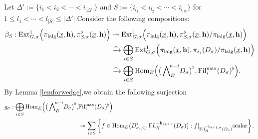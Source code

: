 \documentclass[10pt]{article}
\newcommand{\fil}{{\rm Fil}}
\newcommand{\homo}{{\rm Hom}}
\newcommand{\ext}{{\rm Ext}}
\newcommand{\lalg}{{\rm lalg}}
\newcommand{\bh}{{\mathbf{h}}}
\begin{document}
Let $\Delta':=\{i_1<i_2<\cdots<i_{|\Delta'|}\}$ and $S:=\{i_{l_1}<i_{l_2}<\cdots<i_{l_{|S|}}\}$ for $1\leq l_1<\cdots<l_{|S|}\leq |\Delta'|$.\;Consider the following compositions:
\begin{equation}\label{compositionfinalSver}
	\begin{aligned}
	\beta_S:	\ext^1_{G,\sigma}\Big(\pi_{\lalg}(\underline{x},\bh),\pi^{\flat}_{S,\sigma}(\underline{x},\bh)\Big)&\twoheadrightarrow \ext^1_{G,\sigma}\Big(\pi_{\lalg}(\underline{x},\bh),\pi^{\flat}_{S,\sigma}(\underline{x},\bh)/\pi_{\lalg}(\underline{x},\bh)\Big)\\
		&\xrightarrow{\sim}\bigoplus_{i\in S}\ext^1_{G,\sigma}\Big(\pi_{\lalg}(\underline{x},\bh),\pi_{s_i}(D_{\sigma})/\pi_{\lalg}(\underline{x},\bh)\Big)\\
		&\xrightarrow{\sim}\bigoplus_{i\in S}\homo_E\Big(\big(\bigwedge\nolimits_{E}^{\!n-i}\!D_{\sigma}\big)^{\flat},\fil_i^{\max}(D_{\sigma})^{\flat}\Big).\;
	\end{aligned}
\end{equation}
By Lemma \ref{lemforwedge},\;we obtain the following  surjection
\begin{equation}
	\begin{aligned}
		g_{\sigma}:\bigoplus_{i\in S}\homo_E\Big(\big(\bigwedge\nolimits_{E}^{\!n-i}\!D_{\sigma}\big)^{\flat},&\fil_i^{\max}(D_{\sigma})^{\flat}\Big)\\&\twoheadrightarrow \sum_{i\in S}\left\{f\in\homo_E\big(D_{\sigma,(i)}^{\flat},\fil_H^{-\bh_{i+1,\sigma}}(D_{\sigma})\big):f|_{\fil_H^{-\bh_{i+1,\sigma}}(D_{\sigma})} \text{scalar}\right\}.
	\end{aligned}
\end{equation}
\end{document}
